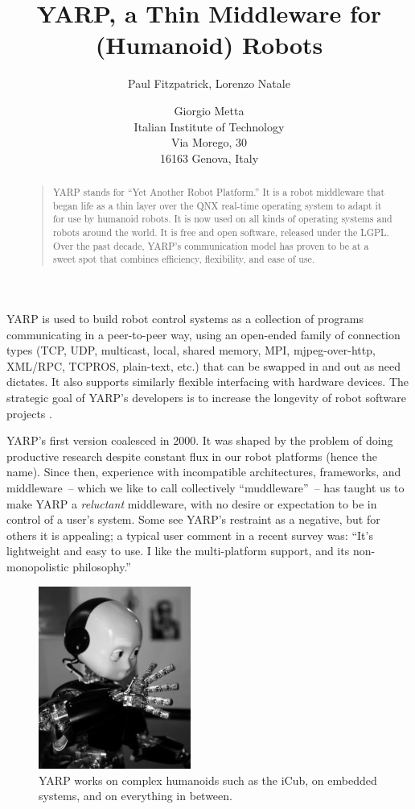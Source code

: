 \documentclass[letterpaper]{article}
\title{YARP, a Thin Middleware for (Humanoid) Robots}
\author{Paul Fitzpatrick{\rm ,}  Lorenzo Natale \and Giorgio Metta \\
Italian Institute of Technology \\
Via Morego, 30 \\16163 Genova, Italy}
\begin{document}
 
\maketitle
\begin{abstract}
\begin{quote}

YARP stands for ``Yet Another Robot Platform.''  It is a robot
middleware that began life as a thin layer over the QNX real-time
operating system to adapt it for use by humanoid robots.  It is now
used on all kinds of operating systems and robots around the world.
It is free and open software, released under the LGPL.  Over the past
decade, YARP's communication model has proven to be at a sweet spot
that combines efficiency, flexibility, and ease of use.

\end{quote}
\end{abstract}

\noindent 
YARP is used to build robot control systems as a collection of
programs communicating in a peer-to-peer way, using an open-ended
family of connection types (TCP, UDP, multicast, local, shared memory, 
MPI, mjpeg-over-http, XML/RPC, TCPROS, plain-text, etc.) that
can be swapped in and out
as need dictates.
It also supports similarly flexible interfacing
with hardware devices.  The strategic goal
of YARP's developers is to increase the longevity
of robot software projects \cite{fitzpatrick08towards}.

YARP's first version coalesced in 2000.  It was 
shaped by the problem of doing productive research despite constant flux
in our robot platforms (hence the name).  Since then, experience with
incompatible architectures, frameworks, and middleware~-- which we like
to call collectively ``muddleware''~-- has taught us to make YARP a {\it
  reluctant} middleware, with no desire or expectation to be in
control of a user's system.  Some see YARP's restraint as a
negative, but for others it is appealing; a typical user comment in a
recent survey was:  ``It's lightweight and easy to use. I like the
multi-platform support, and its non-monopolistic philosophy.''

\begin{figure}
\centerline{\includegraphics[width=5cm]{icub}}
\caption{YARP works on
complex humanoids such as the iCub, on embedded systems, and 
on everything in between.
} 
\end{figure}
\end{document}
